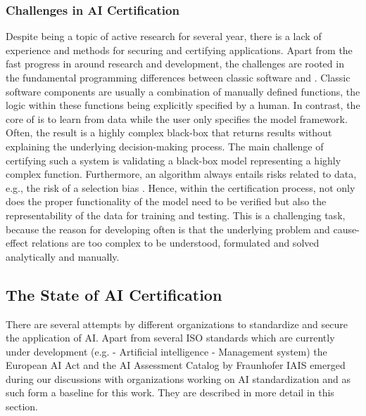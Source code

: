 \subsubsection{Challenges in AI Certification}
Despite being a  topic of active research for several year, there is a lack of experience and methods for securing and certifying  applications.
Apart from the fast progress in   around research and development, the challenges are rooted in the fundamental programming differences between classic software and . 
Classic software components are usually a combination of manually defined functions, the logic within these functions being explicitly specified by a human. In contrast, the core of  is to learn from data while the user only specifies the model framework. Often, the result is a highly complex black-box that returns results without explaining the underlying decision-making process. 
The main challenge of certifying such a system is validating a black-box model representing a highly complex function.  Furthermore, an   algorithm  always entails risks related to data, e.g., the risk of a selection bias \citep {Tidjon2022_ChallengesAI}. %
Hence, within the certification process, not only does the proper functionality of the model need to be verified but also the representability of the data for training and testing. This is a challenging task, because the reason for developing  often is that the underlying problem and cause-effect relations are too complex to be understood, formulated and solved analytically and manually.

\subsection{The State of \ac{AI} Certification}
There are several attempts by different organizations to standardize and secure the application of \ac{AI}. Apart from several ISO standards which are currently under development (e.g. \cite{ISO42001} - Artificial intelligence - Management system)  the European \ac{AI} Act \citep{AiAct} and the AI Assessment Catalog by Fraunhofer IAIS \citep{poretschkin2021_IAIS_Leitfaden} emerged during our discussions with organizations working on AI standardization and as such form a baseline for this work. They are described in more detail in this section.

